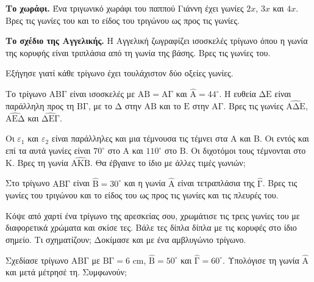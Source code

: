 \ex \textbf{Το χωράφι.} Ένα τριγωνικό χωράφι του παππού Γιάννη έχει γωνίες $2x$, $3x$ και $4x$. Βρες τις γωνίες του και το είδος του τριγώνου ως προς τις γωνίες.

\ex \textbf{Το σχέδιο της Αγγελικής.} Η Αγγελική ζωγραφίζει ισοσκελές τρίγωνο όπου η γωνία της κορυφής είναι τριπλάσια από τη γωνία της βάσης. Βρες τις γωνίες του.


\ex Εξήγησε γιατί κάθε τρίγωνο έχει τουλάχιστον δύο οξείες γωνίες.

\ex Το τρίγωνο $\mathrm{ΑΒΓ}$ είναι ισοσκελές με $\mathrm{ΑΒ}=\mathrm{ΑΓ}$ και $\hat{\mathrm{Α}}=44^\circ$. Η ευθεία $\mathrm{ΔΕ}$ είναι παράλληλη προς τη $\mathrm{ΒΓ}$, με το $\mathrm{Δ}$ στην $\mathrm{ΑΒ}$ και το $\mathrm{Ε}$ στην $\mathrm{ΑΓ}$. Βρες τις γωνίες $\widehat{\mathrm{ΑΔΕ}}$, $\widehat{\mathrm{ΑΕΔ}}$ και $\widehat{\mathrm{ΔΕΓ}}$.

\begin{center}
\end{center}

\ex Οι $\varepsilon_1$ και $\varepsilon_2$ είναι παράλληλες και μια τέμνουσα τις τέμνει στα $\mathrm{Α}$ και $\mathrm{Β}$. Οι εντός και επί τα αυτά γωνίες είναι $70^\circ$ στο $\mathrm{Α}$ και $110^\circ$ στο $\mathrm{Β}$. Οι διχοτόμοι τους τέμνονται στο $\mathrm{Κ}$. Βρες τη γωνία $\widehat{\mathrm{ΑΚΒ}}$. Θα έβγαινε το ίδιο με άλλες τιμές γωνιών;

\ex Στο τρίγωνο $\mathrm{ΑΒΓ}$ είναι $\hat{\mathrm{Β}}=30^\circ$ και η γωνία $\hat{\mathrm{Α}}$ είναι τετραπλάσια της $\hat{\mathrm{Γ}}$. Βρες τις γωνίες του τριγώνου και το είδος του ως προς τις γωνίες και τις πλευρές του.


\ex Κόψε από χαρτί ένα τρίγωνο της αρεσκείας σου, χρωμάτισε τις τρεις γωνίες του με διαφορετικά χρώματα και σκίσε τες. Βάλε τες δίπλα δίπλα με τις κορυφές στο ίδιο σημείο. Τι σχηματίζουν; Δοκίμασε και με ένα αμβλυγώνιο τρίγωνο.

\ex Σχεδίασε τρίγωνο $\mathrm{ΑΒΓ}$ με $\mathrm{ΒΓ}=6$ cm, $\hat{\mathrm{Β}}=50^\circ$ και $\hat{\mathrm{Γ}}=60^\circ$. Υπολόγισε τη γωνία $\hat{\mathrm{Α}}$ και μετά μέτρησέ τη. Συμφωνούν;
